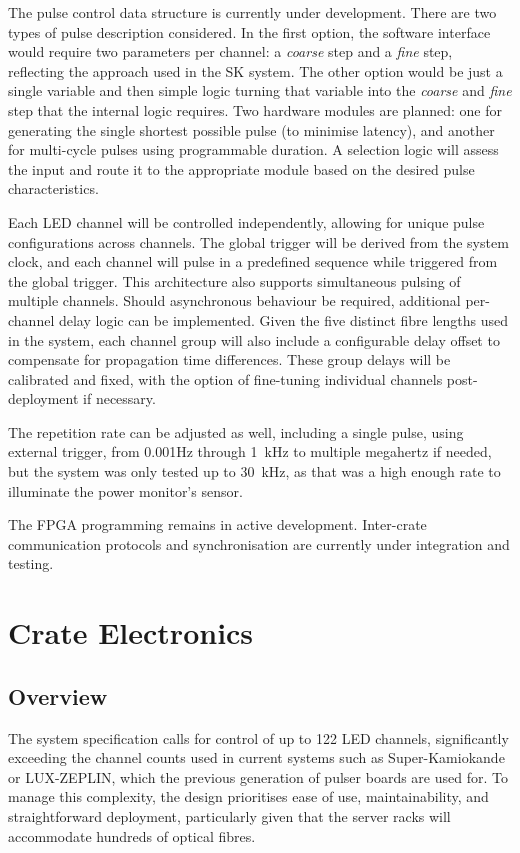 \documentclass[a4paper,11pt]{article}
\begin{document}
The pulse control data structure is currently under development. There are two types of pulse description considered. In the first option, the software interface would require two parameters per channel: a \textit{coarse} step and a \textit{fine} step, reflecting the approach used in the SK system. The other option would be just a single variable and then simple logic turning that variable into the \textit{coarse} and \textit{fine} step that the internal logic requires. Two hardware modules are planned: one for generating the single shortest possible pulse (to minimise latency), and another for multi-cycle pulses using programmable duration. A selection logic will assess the input and route it to the appropriate module based on the desired pulse characteristics.

Each LED channel will be controlled independently, allowing for unique pulse configurations across channels. The global trigger will be derived from the system clock, and each channel will pulse in a predefined sequence while triggered from the global trigger. This architecture also supports simultaneous pulsing of multiple channels. Should asynchronous behaviour be required, additional per-channel delay logic can be implemented. Given the five distinct fibre lengths used in the system, each channel group will also include a configurable delay offset to compensate for propagation time differences. These group delays will be calibrated and fixed, with the option of fine-tuning individual channels post-deployment if necessary.

The repetition rate can be adjusted as well, including a single pulse, using external trigger, from 0.001Hz through 1~kHz to multiple megahertz if needed, but the system was only tested up to  30~kHz, as that was a high enough rate to illuminate the power monitor's sensor.

The FPGA programming remains in active development. Inter-crate communication protocols and synchronisation are currently under integration and testing.

\section{Crate Electronics}\label{sec:crate}

\subsection{Overview}

The system specification calls for control of up to 122 LED channels, significantly exceeding the channel counts used in current systems such as Super-Kamiokande or LUX-ZEPLIN, which the previous generation of pulser boards are used for. To manage this complexity, the design prioritises ease of use, maintainability, and straightforward deployment, particularly given that the server racks will accommodate hundreds of optical fibres.
\end{document}

